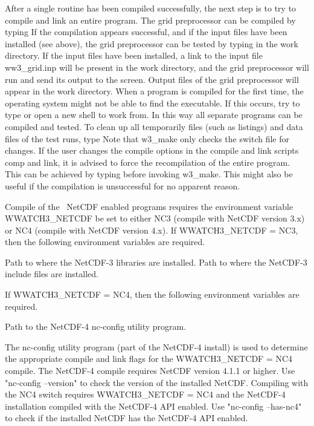 After a single routine has been compiled successfully, the next step is to try
to compile and link an entire program. The grid preprocessor can be compiled
by typing  If the compilation appears successful,
and if the input files have been installed (see above), the grid preprocessor
can be tested by typing  in the work directory. If the
input files have been installed, a link to the input file {\file
ww3\_grid.inp} will be present in the work directory, and the grid
preprocessor will run and send its output to the screen. Output files of the
grid preprocessor will appear in the work directory. When a program is
compiled for the first time, the operating system might not be able to find
the executable. If this occurs, try to type  or open a new
shell to work from. In this way all separate programs can be compiled and
tested. To clean up all temporarily files (such as listings) and data files of
the test runs, type  Note that {\file w3\_make} only checks
the switch file for changes. If the user changes the compile options in the
compile and link scripts {\file comp} and {\file link}, it is advised to force
the recompilation of the entire program. This can be achieved by typing
 before invoking {\file w3\_make}. This
might also be useful if the compilation is unsuccessful for no apparent
reason.

\vspace{\baselineskip} 
\noindent
Compile of the \ws\ NetCDF enabled programs requires the
environment variable {\file WWATCH3\_NETCDF} be set to either
NC3 (compile with NetCDF version 3.x) or
NC4 (compile with NetCDF version 4.x).
If {\file WWATCH3\_NETCDF} = NC3, then the following environment variables
are required.
\begin{flist}
 {Path to where the NetCDF-3 libraries are installed.}
 {Path to where the NetCDF-3 include files are installed.}
\end{flist}
If {\file WWATCH3\_NETCDF} = NC4, then the following environment variables
are required.
\begin{flist}
 {Path to the NetCDF-4 nc-config utility program.}
\end{flist}
The nc-config utility program (part of the NetCDF-4 install) is used to
determine the appropriate compile and link flags for the
{\file WWATCH3\_NETCDF} = NC4 compile.
The NetCDF-4 compile requires NetCDF version 4.1.1 or higher.
Use "{\code nc-config --version}" to check the version of the installed
NetCDF.
Compiling with the {\sc NC4} switch requires {\file WWATCH3\_NETCDF} = NC4
and the NetCDF-4 installation compiled with the NetCDF-4 API enabled.
Use "{\code nc-config --has-nc4}" to check if the installed NetCDF has
the NetCDF-4 API enabled.


